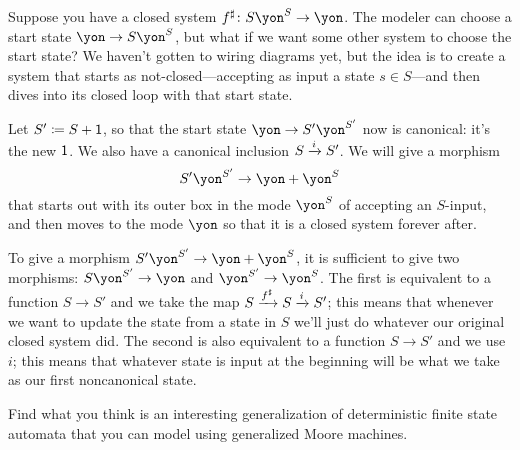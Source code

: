 \documentclass[Book-Poly]{subfiles}
\begin{document}
\begin{example}
Suppose you have a closed system $f^\sharp\colon S\yon^S\to\yon$. The modeler can choose a start state $\yon\to S\yon^S$, but what if we want some other system to choose the start state? We haven't gotten to wiring diagrams yet, but the idea is to create a system that starts as not-closed---accepting as input a state $s\in S$---and then dives into its closed loop with that start state.

Let $S'\coloneqq S+\textsf{1}$, so that the start state $\yon\to S'\yon^{S'}$ now is canonical: it's the new $\textsf{1}$. We also have a canonical inclusion $S\xrightarrow{i}S'$. We will give a morphism
\[
S'\yon^{S'}\to\yon+\yon^S
\]
that starts out with its outer box in the mode $\yon^S$ of accepting an $S$-input, and then moves to the mode $\yon$ so that it is a closed system forever after.

To give a morphism $S'\yon^{S'}\to\yon+\yon^S$, it is sufficient to give two morphisms: $S\yon^{S'}\to\yon$ and $\yon^{S'}\to\yon^S$. The first is equivalent to a function $S\to S'$ and we take the map $S\xrightarrow{f^\sharp}S\xrightarrow{i}S'$; this means that whenever we want to update the state from a state in $S$ we'll just do whatever our original closed system did. The second is also equivalent to a function $S\to S'$ and we use $i$; this means that whatever state is input at the beginning will be what we take as our first noncanonical state.
\end{example}

\begin{exercise}
Find what you think is an interesting generalization of deterministic finite state automata that you can model using generalized Moore machines.
\end{exercise}
\end{document}
